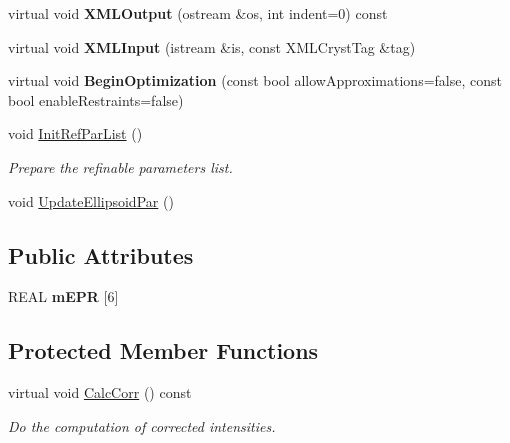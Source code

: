 \begin{DoxyCompactItemize}
\item 
\mbox{\label{class_obj_cryst_1_1_texture_ellipsoid_a0608d653bdfc67dbc2f7ed31af58e771}} 
virtual void {\bfseries X\+M\+L\+Output} (ostream \&os, int indent=0) const
\item 
\mbox{\label{class_obj_cryst_1_1_texture_ellipsoid_af6d7259e38df5ce354a8f894df6fa229}} 
virtual void {\bfseries X\+M\+L\+Input} (istream \&is, const X\+M\+L\+Cryst\+Tag \&tag)
\item 
\mbox{\label{class_obj_cryst_1_1_texture_ellipsoid_ae50fdc4c8f6935590f4096c944e32806}} 
virtual void {\bfseries Begin\+Optimization} (const bool allow\+Approximations=false, const bool enable\+Restraints=false)
\item 
\mbox{\label{class_obj_cryst_1_1_texture_ellipsoid_adf7fb722cc6cbb8aa4bd52fb46e3b1a6}} 
void \mbox{\hyperlink{class_obj_cryst_1_1_texture_ellipsoid_adf7fb722cc6cbb8aa4bd52fb46e3b1a6}{Init\+Ref\+Par\+List}} ()
\begin{DoxyCompactList}\small\item\em Prepare the refinable parameters list. \end{DoxyCompactList}\item 
void \mbox{\hyperlink{class_obj_cryst_1_1_texture_ellipsoid_ae6e72bb7860e157d1c276791ba2148d5}{Update\+Ellipsoid\+Par}} ()
\end{DoxyCompactItemize}
\subsection*{Public Attributes}
\begin{DoxyCompactItemize}
\item 
\mbox{\label{class_obj_cryst_1_1_texture_ellipsoid_a333999be3d051b9d4bd9104b7abbe679}} 
R\+E\+AL {\bfseries m\+E\+PR} \mbox{[}6\mbox{]}
\end{DoxyCompactItemize}
\subsection*{Protected Member Functions}
\begin{DoxyCompactItemize}
\item 
virtual void \mbox{\hyperlink{class_obj_cryst_1_1_texture_ellipsoid_a5b7f34bd6511edb7f0eaab7c6a5e58b8}{Calc\+Corr}} () const
\begin{DoxyCompactList}\small\item\em Do the computation of corrected intensities. \end{DoxyCompactList}\end{DoxyCompactItemize}
